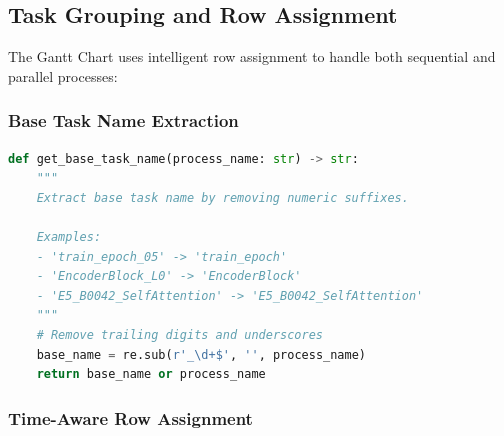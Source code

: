 \documentclass[11pt,a4paper]{article}
\begin{document}
\subsection{Task Grouping and Row Assignment}

The Gantt Chart uses intelligent row assignment to handle both sequential and parallel processes:

\subsubsection{Base Task Name Extraction}

\begin{lstlisting}[language=Python]
def get_base_task_name(process_name: str) -> str:
    """
    Extract base task name by removing numeric suffixes.
    
    Examples:
    - 'train_epoch_05' -> 'train_epoch'
    - 'EncoderBlock_L0' -> 'EncoderBlock'
    - 'E5_B0042_SelfAttention' -> 'E5_B0042_SelfAttention'
    """
    # Remove trailing digits and underscores
    base_name = re.sub(r'_\d+$', '', process_name)
    return base_name or process_name
\end{lstlisting}

\subsubsection{Time-Aware Row Assignment}
\end{document}
